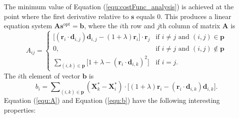 The minimum value of Equation (\ref{equ:costFunc_analysis}) is achieved at the point where the first derivative relative to $\mathbf{s}$ equals 0. This produces a linear equation system $\mathbf{A}\mathbf{s}^\text{opt}= \mathbf{b}$, where the $i$th row and $j$th column of matrix $\mathbf{A}$ is
\begin{equation}
A_{ij}= \begin{cases}
\lbrack(\mathbf{r}_i\cdot\mathbf{d}_{i,j})\mathbf{d}_{i,j}-(1+\lambda)\mathbf{r}_i\rbrack\cdot\mathbf{r}_j  & \text{if } i\neq j \text{ and } (i,j)\in \mathbf{p}\\
0, & \text{if } i\neq j \text{ and } (i,j)\notin \mathbf{p}\\
\sum_{(i,k)\in{\mathbf{p}}}{\lbrack 1+\lambda - (\mathbf{r}_i\cdot\mathbf{d}_{i,k})^2 \rbrack } & \text{if } i=j.
\end{cases}
\label{equ:A}
\end{equation}
The $i$th element of vector $\mathbf{b}$ is
\begin{equation}
b_i=\sum\nolimits_{(i,k)\in{\mathbf{p}}}(\mathbf{X}_k^*-\mathbf{X}_i^*)\cdot \lbrack(1+\lambda)\mathbf{r}_i - (\mathbf{r}_i\cdot \mathbf{d}_{i,k})\mathbf{d}_{i,k} \rbrack.
\label{equ:b}
\end{equation}
Equation (\ref{equ:A}) and Equation (\ref{equ:b}) have the following interesting properties:

